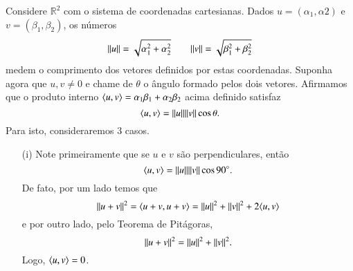 \begin{exemplo}
  Considere ${\mathbb{R}}^2$ com o sistema de coordenadas cartesianas. Dados $u=(\alpha_1,\alpha2)$ e $v=(\beta_1,\beta_2)$, os números
  \begin{equation*}
    \| u \| = \sqrt{\alpha_1^2+\alpha_2^2} \qquad \| v \| = \sqrt{\beta_1^2+\beta_2^2}
  \end{equation*}
  medem o comprimento dos vetores definidos por estas coordenadas. Suponha agora que $u,v\ne 0$ e chame de $\theta$ o ângulo formado pelos dois vetores. Afirmamos que o produto interno $\langle u, v \rangle = \alpha_1\beta_1+\alpha_2\beta_2$ acima definido satisfaz
\begin{equation*}
  \langle u, v \rangle = \| u \|\| v \| \cos{\theta}.
\end{equation*}
Para isto, consideraremos 3 casos.
\begin{itemize}
	\item[(i)] Note primeiramente que se $u$ e $v$ são perpendiculares, então 
	\begin{equation*}
  		\langle u, v \rangle = \| u \|\| v \|\cos{90^{\circ}}.
	\end{equation*}
	De fato, por um lado temos que
	\begin{equation*}
  		\| u+v \|^2 = \langle u+v, u+v \rangle = \| u \|^2+\| v \|^2+2\langle u, v \rangle
	\end{equation*}
	e por outro lado, pelo Teorema de Pitágoras,
	\begin{equation*}
  		\| u+v \|^2 = \| u \|^2+\| v \|^2.
	\end{equation*}
	Logo, $\langle u, v \rangle=0$. 


\end{itemize}
\end{exemplo}
